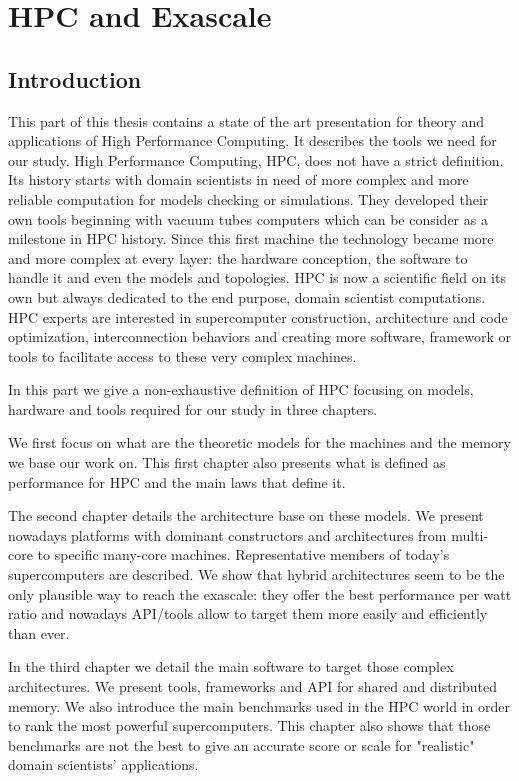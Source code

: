 \part{HPC and Exascale}
\chapter*{Introduction}

This part of this thesis contains a state of the art presentation for theory and applications of High Performance Computing.
It describes the tools we need for our study. 
High Performance Computing, HPC, does not have a strict definition. 
Its history starts with domain scientists in need of more complex and more reliable computation for models checking or simulations. 
They developed their own tools beginning  with vacuum tubes computers which can be consider as a milestone in HPC history. 
Since this first machine the technology became more and more complex at every layer: the hardware conception, the software to handle it and even the models and topologies.
HPC is now a scientific field on its own but always dedicated to the end purpose, domain scientist computations. 
HPC experts are interested in supercomputer construction, architecture and code optimization, interconnection behaviors and creating more software, framework or tools to facilitate access to these very complex machines. 

In this part we give a non-exhaustive definition of HPC focusing on models, hardware and tools required for our study in three chapters.

We first focus on what are the theoretic models for the machines and the memory we base our work on. 
This first chapter also presents what is defined as performance for HPC and the main laws that define it. 

The second chapter details the architecture base on these models. 
We present nowadays platforms with dominant constructors and architectures from multi-core to specific many-core machines. 
Representative members of today's supercomputers are described.  
We show that hybrid architectures seem to be the only plausible way to reach the exascale: they offer the best performance per watt ratio and nowadays API/tools allow to target them more easily and efficiently than ever.  

In the third chapter we detail the main software to target those complex architectures. 
We present tools, frameworks and API for shared and distributed memory. 
We also introduce the main benchmarks used in the HPC world in order to rank the most powerful supercomputers. 
This chapter also shows that those benchmarks are not the best to give an accurate score or scale for "realistic" domain scientists' applications.

